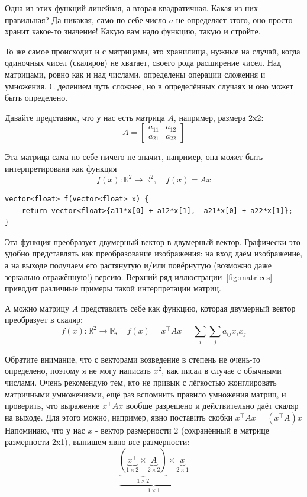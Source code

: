 \documentclass{article}
\begin{document}
Одна из этих функций линейная, а вторая квадратичная. Какая из них правильная? Да никакая, само по себе число $a$ не определяет этого, оно просто хранит какое-то значение! Какую вам надо функцию, такую и стройте.

То же самое происходит и с матрицами, это хранилища, нужные на случай, когда одиночных чисел (скаляров) не хватает, своего рода расширение чисел.  Над матрицами, ровно как и над числами, определены операции сложения и умножения. С делением чуть сложнее, но в определённых случаях и оно может быть определено.

Давайте представим, что у нас есть матрица $A$, например, размера 2x2:
$$
A=\begin{bmatrix} a_{11} & a_{12} \\ a_{21} & a_{22}\end{bmatrix}
$$

Эта матрица сама по себе ничего не значит, например, она может быть интерпретирована как функция
$$
f(x) : \mathbb R^2 \rightarrow \mathbb R^2, \quad f(x) = Ax
$$

\begin{verbatim}    
vector<float> f(vector<float> x) {
    return vector<float>{a11*x[0] + a12*x[1],  a21*x[0] + a22*x[1]};
}
\end{verbatim}

Эта функция преобразует двумерный вектор в двумерный вектор. Графически это удобно представлять как преобразование изображения: на вход даём изображение, а на выходе получаем его растянутую и/или повёрнутую (возможно даже зеркально отражённую!) версию.
Верхний ряд иллюстрации~\ref{fig:matrices} приводит различные примеры такой интерпретации матриц.


А можно матрицу $A$ представлять себе как функцию, которая двумерный вектор преобразует в скаляр:
$$
f(x) : \mathbb R^2 \rightarrow \mathbb R, \quad f(x) = x^\top A x = \sum\limits_i\sum\limits_j a_{ij}x_i x_j
$$

Обратите внимание, что с векторами возведение в степень не очень-то определено, поэтому я не могу написать $x^2$, как писал в случае с обычными числами. Очень рекомендую тем, кто не привык с лёгкостью жонглировать матричными умножениями, ещё раз вспомнить правило умножения матриц, и проверить, что выражение $x^\top A x$ вообще разрешено и действительно даёт скаляр на выходе.
Для этого можно, например, явно поставить скобки $x^\top A x = (x^\top A) x$
Напоминаю, что у нас $x$ - вектор размерности 2 (сохранённый в матрице размерности 2x1), выпишем явно все размерности:
$$
\underbrace{\underbrace{\left(\underbrace{x^\top}_{1\times 2} \times \underbrace{A}_{2\times 2}\right)}_{1\times 2} \times \underbrace{x}_{2\times 1}}_{1 \times 1}
$$
\end{document}
